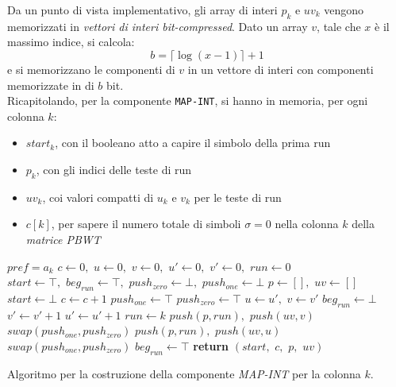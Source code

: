 Da un punto di vista implementativo, gli array di interi $p_k$ e $uv_k$ vengono
memorizzati in \textit{vettori di interi bit-compressed}. Dato un array $v$,
tale che $x$ è il massimo indice, si calcola:
\begin{equation}
  \label{eq:bc1}
  b=\lceil\log(x-1)\rceil+1
\end{equation}
e si memorizzano le componenti di $v$ in un vettore di interi con componenti
memorizzate in di $b$ bit.\\
Ricapitolando, per la componente \texttt{MAP-INT}, si hanno in memoria, per
ogni colonna $k$:
\begin{itemize}
  \item $start_k$, con il booleano atto a capire il simbolo della prima run
  \item $p_k$, con gli indici delle teste di run
  \item $uv_k$, coi valori compatti di $u_k$ e $v_k$ per le teste di run
  \item $c[k]$, per sapere il numero totale di simboli $\sigma=0$ nella colonna
  $k$ della \textit{matrice PBWT}
\end{itemize}
\begin{algorithm}
  \small
  \begin{algorithmic}[1]
    \Comment $pref=a_k$
    \State $c\gets 0,\,\,u\gets 0,\,\,v\gets 0,\,\,u'\gets 0,\,\, v'\gets
    0,\,\,run\gets 0$
    \State $start \gets \top,\,\,beg_{run}\gets \top,\,\,push_{zero}\gets
    \bot,\,\,push_{one}\gets \bot$
    \State $p\gets [],\,\,uv\gets []$
    \For {\textit{every} $k\in\left[0,\,\, M\right)$}
    \State $start \gets \bot$
    \EndIf
    \State $c\gets c+1$
    \EndIf
    \EndFor
    \State $push_{one}\gets \top$
    \Else
    \State $push_{zero}\gets \top$
    \EndIf
    \For{\textit{every} $k\in[0,M)$}
    \State $u\gets u',\,\,v\gets v'$
    \State $beg_{run}\gets \bot$
    \EndIf
    \State $v'\gets v'+1$
    \Else
    \State $u'\gets u'+1$
    \EndIf
    \State $run\gets k$
    \EndIf
    \State $push(p, run),\,\,push(uv, v)$
    \State $swap(push_{one}, push_{zero})$
    \Else
    \State $push(p, run),\,\,push(uv, u)$
    \State $swap(push_{one}, push_{zero})$
    \EndIf
    \State $beg_{run}\gets \top$
    \EndIf
    \EndFor
    \State \textbf{return} $(start,\,\, c,\,\, p,\,\, uv)$
    \EndFunction
  \end{algorithmic}
  \caption{\footnotesize{Algoritmo per la costruzione della componente
  \textit{MAP-INT} per la colonna $k$.}}
  \label{algo:buildnaive}
\end{algorithm}
